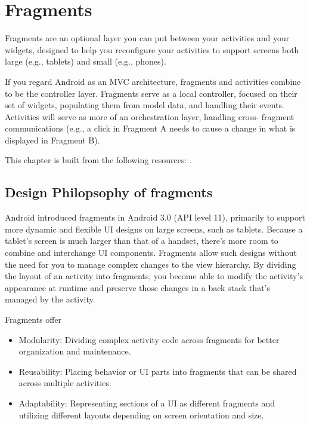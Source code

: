 
\chapter{Fragments}
Fragments are an optional layer you can put between your activities and your widgets, designed to help you reconfigure your activities to support screens both large (e.g., tablets) and small (e.g., phones). 

If you regard Android as an MVC architecture, fragments and activities combine to be the controller layer. Fragments serve as a local controller, focused on their set of widgets, populating them from model data, and handling
their events. Activities will serve as more of an orchestration layer, handling cross- fragment communications (e.g., a click in Fragment A needs to cause a change in what is displayed in Fragment B).

This chapter is built from the following resources: \cite{Point2017, TueDao2017, Guide2017, murphymarkl.2017,Gleason2017}.

\section{Design Philopsophy of fragments}
Android introduced fragments in Android 3.0 (API level 11), primarily to support more dynamic and flexible UI designs on large screens, such as tablets. Because a tablet's screen is much larger than that of a handset, there's more room to combine and interchange UI components. Fragments allow such designs without the need for you to manage complex changes to the view hierarchy. By dividing the layout of an activity into fragments, you become able to modify the activity's appearance at runtime and preserve those changes in a back stack that's managed by the activity.

Fragments offer

\begin{itemize}
	\item Modularity: Dividing complex activity code across fragments for better organization and maintenance.
	\item Reusability: Placing behavior or UI parts into fragments that can be shared across multiple activities.
	\item Adaptability: Representing sections of a UI as different fragments and utilizing different layouts depending on screen orientation and size.
\end{itemize}

